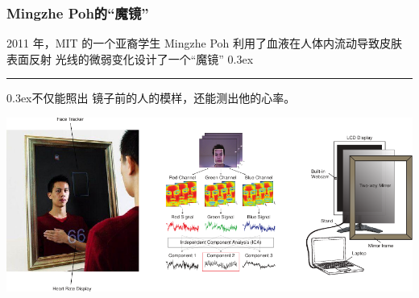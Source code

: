 \documentclass[xcolor=svgnames,serif,table]{beamer}
\newcommand{\pozhehao}{\kern0.3ex\rule[0.8ex]{2em}{0.1ex}\kern0.3ex}
\begin{document}
\begin{frame}
  \frametitle{Mingzhe Poh的“魔镜”}
  2011 年，MIT 的一个亚裔学生 Mingzhe Poh 利用了血液在人体内流动导致皮肤表面反射
  光线的微弱变化设计了一个“魔镜”\cite{poh2010non,poh2011medical} \pozhehao 不仅能照出
  镜子前的人的模样，还能测出他的心率。
\begin{center}
    \includegraphics[width=\textwidth]{mirror.pdf}
  \end{center}
\end{frame}
\end{document}
